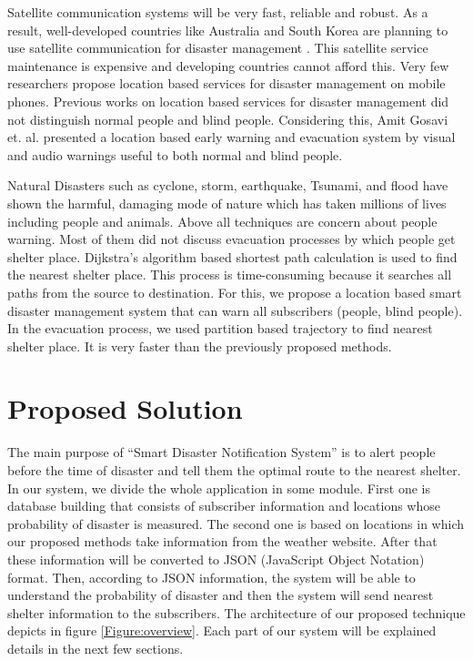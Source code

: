 \documentclass[conference]{IEEEtran}
\begin{document}
Satellite communication systems will be very fast, reliable and robust. As a result, well-developed countries like Australia and South Korea are planning to use satellite communication for disaster management \cite{park2006one, aloudat2011toward,jeong2009national}. This satellite service maintenance is expensive and developing countries cannot afford this. Very few researchers propose location based services for disaster management on mobile phones. Previous works on location based services for disaster management did not distinguish normal people and blind people. Considering this, Amit Gosavi et. al. \cite{amit2014} presented a location based early warning and evacuation system by visual and audio warnings useful to both normal and blind people. 

Natural Disasters such as cyclone, storm, earthquake, Tsunami, and flood have shown the harmful, damaging mode of nature which has taken millions of lives including people and animals. Above all techniques are concern about people warning. Most of them did not discuss evacuation processes by which people get shelter place. Dijkstra's algorithm based shortest path calculation is used to find the nearest shelter place\cite{amit2014}. This process is time-consuming because it searches all paths from the source to destination. For this, we propose a location based smart disaster management system that can warn all subscribers (people, blind people). In the evacuation process, we used partition based trajectory to find nearest shelter place. It is very faster than the previously proposed methods.  

\section {Proposed Solution}
\label{sec:problem}

The main purpose of “Smart Disaster Notification System” is to alert people before the time of disaster and tell them the optimal route to the nearest shelter. In our system, we divide the whole application in some module. First one is database building that consists of subscriber information and locations whose probability of disaster is measured. The second one is based on locations in which our proposed methods take information from the weather website. After that these information will be converted to JSON (JavaScript Object Notation) \cite{bray2014javascript} format. Then,  according to JSON information, the system will be able to understand the probability of disaster and then the system will send nearest shelter information to the subscribers. The architecture of our proposed technique depicts in figure \ref{Figure:overview}. Each part of our system will be explained details in the next few sections. 
\end{document}
